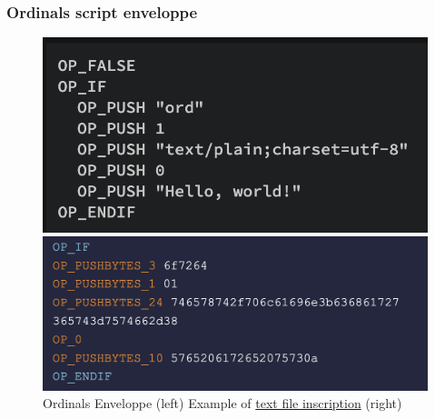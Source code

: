 \documentclass[hyperref={colorlinks=true}]{beamer}
\begin{document}
\begin{frame}
\frametitle{Ordinals script enveloppe}

\begin{center}

\begin{figure}
  \label{ord}
  \centering
  \begin{minipage}[b]{0.45\textwidth}
    \centering
    \includegraphics[width=\textwidth]{./assets/ord_enveloppe.png}
  \end{minipage}
  \hfill
  \begin{minipage}[b]{0.51\textwidth}
    \centering
    \includegraphics[width=\textwidth]{./assets/ord_tx.png}
  \end{minipage}
  \caption{Ordinals Enveloppe (left) Example of \href{https://mempool.space/tx/58a9c5a603b9dcf4a94ab925764783a0d21f3cf7ee86c02bddfd8b41e0b3da72}{text file inscription} (right)}

\end{figure}

\end{center}
\end{frame}
\end{document}
